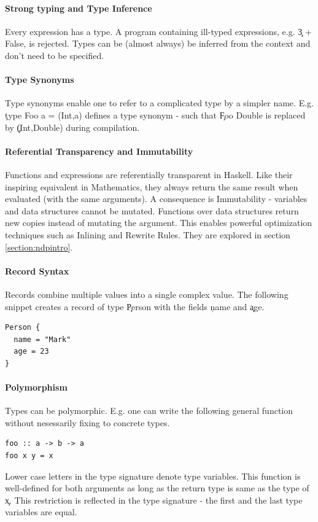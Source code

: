   \paragraph{Strong typing and Type Inference}
    Every expression has a type. A program containing
    ill-typed expressions, e.g. \c{3 + False}, is rejected.
    Types can be (almost always) be inferred from the context and
    don't need to be specified.
    
  \paragraph{Type Synonyms}
    Type synonyms enable one to refer to a complicated type by a simpler name.
    E.g. \c{type Foo a = (Int,a)} defines a type synonym - such that
    \c{Foo Double} is replaced by \c{(Int,Double)} during compilation.
  
  \paragraph{Referential Transparency and Immutability}
    Functions and expressions are referentially transparent in Haskell.
    Like their inspiring equivalent in Mathematics, they always return
    the same result when evaluated (with the same arguments).
    A consequence is Immutability - variables and data structures
    cannot be mutated. Functions over data structures return
    new copies instead of mutating the argument. This enables
    powerful optimization techniques such as Inlining and Rewrite Rules.
    They are explored in section \ref{section:ndpintro}.
    
  \paragraph{Record Syntax}
    Records combine multiple values into a single complex value.
    The following snippet creates a record of type \c{Person} with the
    fields \c{name} and \c{age}.
    \begin{lstlisting}
Person {
  name = "Mark"
  age = 23
}
    \end{lstlisting}
    
  \paragraph{Polymorphism}
    Types can be polymorphic. 
    E.g. one can write the following general function
    without nesessarily fixing to concrete types.
    \begin{lstlisting}
foo :: a -> b -> a
foo x y = x
    \end{lstlisting}
    Lower case letters in the type signature denote type variables.
    This function is well-defined for both arguments
    as long as the return type is same as the type of \c{x}. This
    restriction is reflected in the type signature - the first and
    the last type variables are equal. 
    
